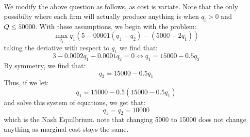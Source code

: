 \documentclass[11pt]{article}
\begin{document}
\section{}
We modify the above question as follows, as cost is variate. Note that the only possibilty where each firm will actually produce anything is when $q_i > 0$ and $Q \leq 50000$. With these assumptions, we begin with the problem:
\[
\max_{q_1} q_1( 5 - 00001(q_1 + q_2) - (5000 - 2q_1))
\]
taking the deriative with respect to $q_1$ we find that:
\[
3 - 0.0002q_1 - 0.0001q_2 = 0 \iff q_1 = 15000 - 0.5q_2
\]
By symmetry, we find that:
\[
q_2 = 15000 - 0.5q_1
\]
Thus, if we let:
\[
    q_1 = 15000 - 0.5(15000 - 0.5q_1)
\]
and solve this system of equations, we get that:
\[
q_1 = q_2 = 10000
\]
which is the Nash Equilbrium. 
note that changing 5000 to 15000 does not change anything as marginal cost stays the same. 
\section{}
\end{document}
